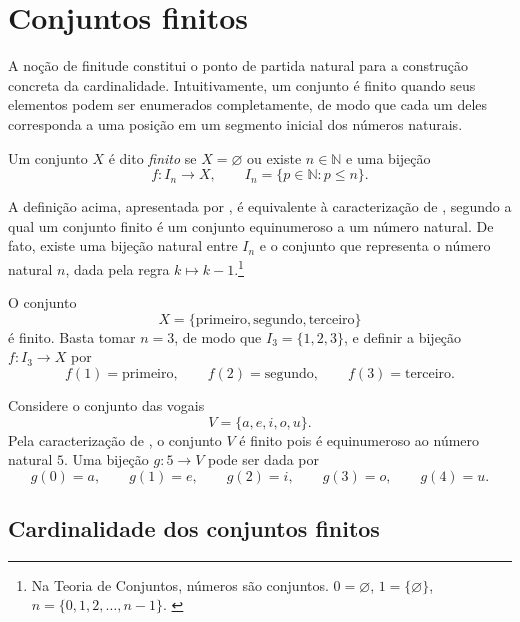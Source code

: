\section{Conjuntos finitos}
\label{sec:conjuntos_finitos}
A noção de finitude constitui o ponto de partida natural para a construção concreta da cardinalidade. Intuitivamente, um conjunto é finito quando seus elementos podem ser enumerados completamente, de modo que cada um deles corresponda a uma posição em um segmento inicial dos números naturais.

\begin{definicao}
    \label{def:conjunto_finito}
    Um conjunto \(X\) é dito \emph{finito} se \(X=\varnothing\) ou existe
    \(n\in\mathbb{N}\) e uma bijeção
    \[
        f:I_n\to X,
        \qquad
        I_n=\{p\in\mathbb{N}:p\leq n\}.
    \]
\end{definicao}

A definição acima, apresentada por \textcite[p.~3]{lima2006}, é equivalente à caracterização de
\textcite[p.~53]{halmos2014}, segundo a qual um conjunto finito é um conjunto
equinumeroso a um número natural. De fato, existe uma bijeção natural entre
\(I_n\) e o conjunto que representa o número natural \(n\), dada pela regra
\(k\mapsto k-1\).\footnote{Na Teoria de Conjuntos, números são conjuntos.
    \(0=\varnothing\), \(1=\{\varnothing\}\), \(n=\{0,1,2,\dots,n-1\}\).
    \label{fn:definicao_numero_halmos}}

\begin{exemplo}
    \label{ex:finito-elon}
    O conjunto
    \[
        X=\{\text{primeiro},\text{segundo},\text{terceiro}\}
    \]
    é finito. Basta tomar \(n=3\), de modo que
    \(I_3=\{1,2,3\}\), e definir a bijeção
    \(f:I_3\to X\) por
    \[
        f(1)=\text{primeiro},\qquad
        f(2)=\text{segundo},\qquad
        f(3)=\text{terceiro}.
    \]
\end{exemplo}

\begin{exemplo}
    \label{ex:finito-halmos}
    Considere o conjunto das vogais
    \[
        V=\{a,e,i,o,u\}.
    \]
    Pela caracterização de \textcite{halmos2014}, o conjunto \(V\) é finito
    pois é equinumeroso ao número natural \(5\). Uma bijeção
    \(g:5\to V\) pode ser dada por
    \[
        g(0)=a,\qquad
        g(1)=e,\qquad
        g(2)=i,\qquad
        g(3)=o,\qquad
        g(4)=u.
    \]
\end{exemplo}

\subsection{Cardinalidade dos conjuntos finitos}
\label{subsec:cardinalidade_conjuntos_finitos}

